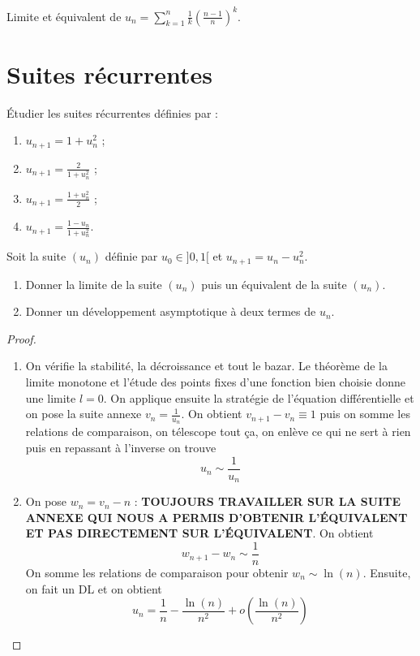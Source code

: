 \documentclass[french,a4paper]{article}
\theoremstyle{plain}
\theoremstyle{definition}
\theoremstyle{remark}
\begin{document}
\begin{ex}{}
	Limite et équivalent de $u_n=\displaystyle\sum_{k=1}^{n}\frac{1}{k}\left(\frac{n-1}{n}\right)^k$.
\end{ex}

\section{Suites récurrentes}

\begin{ex}{}
	Étudier les suites récurrentes définies par :
	\begin{enumerate}
		\item $\displaystyle u_{n+1}=1+u_n^2$ ;
		\item $\displaystyle u_{n+1}=\frac{2}{1+u_n^2}$ ;
		\item $\displaystyle u_{n+1}=\frac{1+u_n^2}{2}$ ;
		\item $\displaystyle u_{n+1}=\frac{1-u_n}{1+u_n^2}$.
	\end{enumerate}
\end{ex}

\begin{ex}{}
	Soit la suite $(u_n)$ définie par $u_0\in]0,1[$ et $u_{n+1}=u_n-u_n^2$.
	\begin{enumerate}
		\item Donner la limite de la suite $(u_n)$ puis un équivalent de la suite $(u_n)$.
		\item Donner un développement asymptotique à deux termes de $u_n$.
	\end{enumerate}
\end{ex}

\begin{proof}
	\begin{enumerate}
		\item On vérifie la stabilité, la décroissance et tout le bazar. Le théorème de la limite monotone et l'étude des points fixes d'une fonction bien choisie donne une limite $l=0$. On applique ensuite la stratégie de l'équation différentielle et on pose la suite annexe $v_n=\displaystyle\frac{1}{u_n}$. On obtient $v_{n+1}-v_n\equiv 1$ puis on somme les relations de comparaison, on télescope tout ça, on enlève ce qui ne sert à rien puis en repassant à l'inverse on trouve $$u_n\sim\frac{1}{u_n}$$
		\item On pose $w_n=v_n-n$ : \textbf{TOUJOURS TRAVAILLER SUR LA SUITE ANNEXE QUI NOUS A PERMIS D'OBTENIR L'ÉQUIVALENT ET PAS DIRECTEMENT SUR L'ÉQUIVALENT}. On obtient $$w_{n+1}-w_n\sim\frac{1}{n}$$ On somme les relations de comparaison pour obtenir $w_n\sim\ln(n)$. Ensuite, on fait un DL et on obtient $$u_n=\frac{1}{n}-\frac{\ln(n)}{n^2}+o\left(\frac{\ln(n)}{n^2}\right)$$
	\end{enumerate}
\end{proof}
\end{document}
